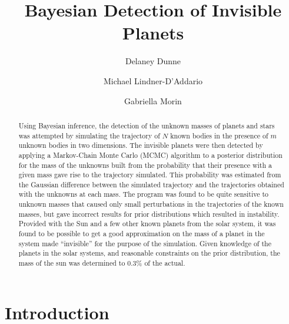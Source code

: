 \documentclass[twocolumn]{aastex63}
\begin{document}
\title{Bayesian Detection of Invisible Planets}

\author{Delaney Dunne}

\author{Michael Lindner-D'Addario}

\author{Gabriella Morin}



\begin{abstract}

Using Bayesian inference, the detection of the unknown masses of planets and stars was attempted by simulating the trajectory of $N$ known bodies in the presence of $m$ unknown bodies in two dimensions. The invisible planets were then detected by applying a Markov-Chain Monte Carlo (MCMC) algorithm to a posterior distribution for the mass of the unknowns built from the probability that their presence with a given mass gave rise to the trajectory simulated. This probability was estimated from the Gaussian difference between the simulated trajectory and the trajectories obtained with the unknowns at each mass. The program was found to be quite sensitive to unknown masses that caused only small perturbations in the trajectories of the known masses, but gave incorrect results for prior distributions which resulted in instability. Provided with the Sun and a few other known planets from the solar system, it was found to be possible to get a good approximation on the mass of a planet in the system made ``invisible'' for the purpose of the simulation. Given knowledge of the planets in the solar systems, and reasonable constraints on the prior distribution, the mass of the sun was determined to 0.3\% of the actual.

\end{abstract}




\section{Introduction} \label{sec:intro}
\end{document}
